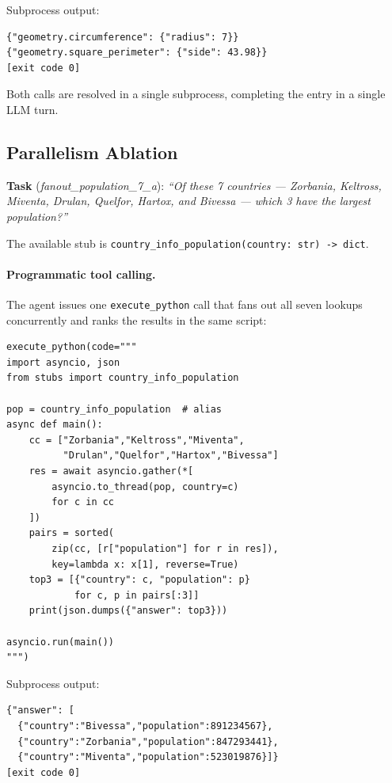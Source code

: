 \documentclass[11pt]{article}
\newcommand{\Codemode}{Programmatic tool calling}
\begin{document}
Subprocess output:
{\footnotesize\begin{verbatim}
{"geometry.circumference": {"radius": 7}}
{"geometry.square_perimeter": {"side": 43.98}}
[exit code 0]
\end{verbatim}
}

Both calls are resolved in a single subprocess, completing the entry in a single LLM turn.

\subsection{Parallelism Ablation}
\label{app:walk_parallelism}

\textbf{Task} (\textit{fanout\_population\_7\_a}):
\emph{``Of these 7 countries — Zorbania, Keltross, Miventa, Drulan, Quelfor,
Hartox, and Bivessa — which 3 have the largest population?''}

The available stub is \texttt{country\_info\_population(country: str) -> dict}.

\paragraph{\Codemode{}.}
The agent issues one \texttt{execute\_python} call that fans out all seven
lookups concurrently and ranks the results in the same script:
{\footnotesize\begin{verbatim}
execute_python(code="""
import asyncio, json
from stubs import country_info_population

pop = country_info_population  # alias
async def main():
    cc = ["Zorbania","Keltross","Miventa",
          "Drulan","Quelfor","Hartox","Bivessa"]
    res = await asyncio.gather(*[
        asyncio.to_thread(pop, country=c)
        for c in cc
    ])
    pairs = sorted(
        zip(cc, [r["population"] for r in res]),
        key=lambda x: x[1], reverse=True)
    top3 = [{"country": c, "population": p}
            for c, p in pairs[:3]]
    print(json.dumps({"answer": top3}))

asyncio.run(main())
""")
\end{verbatim}
}

Subprocess output:
{\footnotesize\begin{verbatim}
{"answer": [
  {"country":"Bivessa","population":891234567},
  {"country":"Zorbania","population":847293441},
  {"country":"Miventa","population":523019876}]}
[exit code 0]
\end{verbatim}
}
\end{document}
